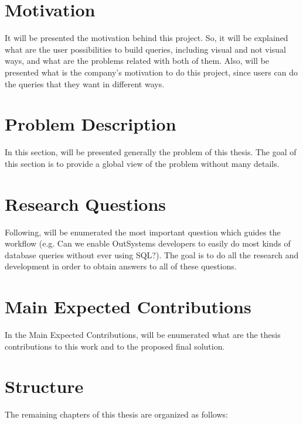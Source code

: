 \section{Motivation}
\label{sec:motivation}
It will be presented the motivation behind this project. So, it will be explained 
what are the user possibilities to build queries, including visual and not 
visual ways, and what are the problems related with both of them. Also, will be 
presented what is the company's motivation to do this project, since users can do 
the queries that they want in different ways.

\section{Problem Description}
\label{sec:problem_description}
In this section, will be presented generally the problem of this thesis. The goal 
of this section is to provide a global view of the problem without many details.

\section{Research Questions}
\label{sec:research_questions}
Following, will be enumerated the most important question which guides the workflow
(e.g. Can we enable OutSystems developers to easily do most kinds of database 
queries without ever using SQL?). The goal is to do all the research and 
development in order to obtain answers to all of these questions.

\section{Main Expected Contributions}
\label{sec:main_exp_contributions}
In the Main Expected Contributions, will be enumerated what are the thesis 
contributions to this work and to the proposed final solution.

\section{Structure}
\label{sec:structure}

The remaining chapters of this thesis are organized as follows:


